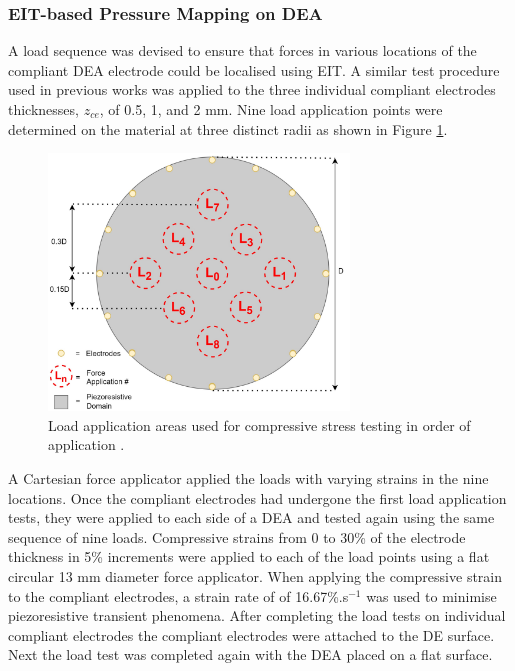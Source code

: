 	\subsubsection{EIT-based Pressure Mapping on DEA}
	\label{subsubsec:eit_test}
	A load sequence was devised to ensure that forces in various locations of the compliant DEA electrode could be localised using EIT. A similar test procedure used in previous works\cite{Ellingham2024, Ellingham2024a} was applied to the three individual compliant electrodes thicknesses, $z_{ce}$, of 0.5, 1, and 2 mm. Nine load application points were determined on the material at three distinct radii as shown in Figure \ref{fig:force_app_map}.
	\begin{figure}[H]
		\centering
		\includegraphics[width=8cm]{Figures/EIT_force_app_points_v3.11.jpg}
        \vspace{0.2cm}
		\caption{Load application areas used for compressive stress testing in order of application\cite{Ellingham2024} .}
		\label{fig:force_app_map}
	\end{figure}
	A Cartesian force applicator applied the loads with varying strains in the nine locations. Once the compliant electrodes had undergone the first load application tests, they were applied to each side of a DEA and tested again using the same sequence of nine loads. Compressive strains from 0 to 30\% of the electrode thickness in 5\% increments were applied to each of the load points using a flat circular 13 mm diameter force applicator. When applying the compressive strain to the compliant electrodes, a strain rate of of 16.67\%.s$^{-1}$ was used to minimise piezoresistive transient phenomena. After completing the load tests on individual compliant electrodes the compliant electrodes were attached to the DE surface. Next the load test was completed again with the DEA placed on a flat surface.

